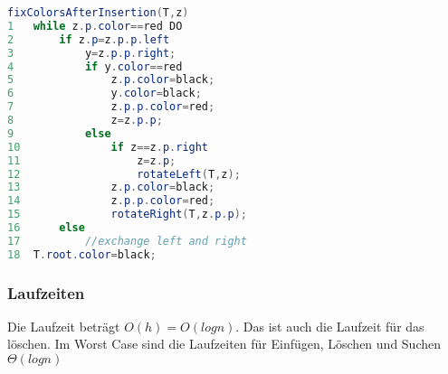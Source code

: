 \documentclass[jou,apacite]{apa6}
\begin{document}
\begin{lstlisting}[language=java]
fixColorsAfterInsertion(T,z)
1   while z.p.color==red DO
2       if z.p=z.p.p.left 
3           y=z.p.p.right;
4           if y.color==red 
5               z.p.color=black;
6               y.color=black;
7               z.p.p.color=red;
8               z=z.p.p;
9           else
10              if z==z.p.right 
11                  z=z.p;
12                  rotateLeft(T,z);
13              z.p.color=black;
14              z.p.p.color=red;
15              rotateRight(T,z.p.p);
16      else
17          //exchange left and right
18  T.root.color=black;
\end{lstlisting}

\subsubsection{Laufzeiten} Die Laufzeit beträgt $O(h) = O(log n)$. Das ist auch die Laufzeit für das löschen. Im Worst Case sind die Laufzeiten für Einfügen, Löschen und Suchen $\Theta(log n)$
\end{document}
